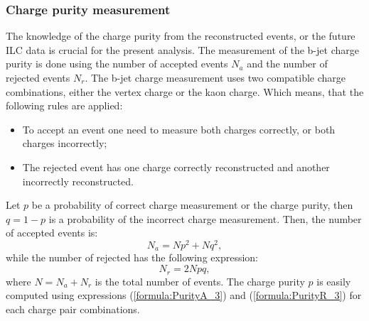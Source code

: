 \subsubsection{Charge purity measurement}
\label{sec:ChargePurity}
The knowledge of the charge purity from the reconstructed events, or the future ILC data is crucial for the present analysis. 
The measurement of the b-jet charge purity is done using the number of accepted events $N_a$ and the number of rejected events $N_r$. 
The b-jet charge measurement uses two compatible charge combinations, either the vertex charge or the kaon charge.
 Which means, that the following rules are applied:
\begin{itemize}
	\item To accept an event one need to measure both charges correctly, or both charges incorrectly;
	\item The rejected event has one charge correctly reconstructed and another incorrectly reconstructed. 
\end{itemize}

Let $p$ be a probability of correct charge measurement or the charge purity, then $q = 1-p$ is a probability of the incorrect charge measurement. 
Then, the number of accepted events is:
\begin{equation}
	N_a = N p^2 + N q^2,
	\label{formula:PurityA_3}
\end{equation}
while the number of rejected has the following expression:
\begin{equation}
	N_r = 2N pq,
	\label{formula:PurityR_3}
\end{equation}
where $N = N_a + N_r$ is the total number of events.
The charge purity $p$ is easily computed using expressions (\ref{formula:PurityA_3}) and (\ref{formula:PurityR_3}) for each charge pair combinations.

